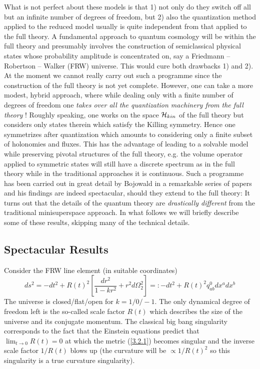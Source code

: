 \documentclass[12pt]{report}
\def\be{\begin{equation}}
\def\ee{\end{equation}}
\begin{document}
What is not perfect about these models is that 1) not only do they switch off
all but an infinite number of degrees of freedom, but 2) also the 
quantization method applied to the reduced model usually is quite 
independent from that applied to the full theory. A fundamental approach to
quantum cosmology will be within the full theory and presumably involves 
the construction of semiclassical physical states whose probability 
amplitude is concentrated on, say a Friedmann -- Robertson -- Walker (FRW)
universe. This would cure both drawbacks 1) and 2). At the moment we 
cannot really carry out such a programme since the construction of the full
theory is not yet complete. However, one can take a more modest, hybrid
approach, where while dealing only with a finite number of degrees of 
freedom one {\it takes over all the quantization machinery from the full 
theory} ! Roughly speaking, one works on the space ${\cal H}_{kin}$ of 
the full theory but considers only states therein which satisfy the 
Killing symmetry. Hence one symmetrizes after quantization which amounts to
considering only a finite subset of holonomies and fluxes. This has the 
advantage of leading to a solvable model while preserving pivotal 
structures of the 
full theory, e.g. the volume operator applied to symmetric states will still
have a discrete spectrum as in the full theory while in the traditional
approaches it is continuous. Such a programme has been carried out in great
detail by Bojowald in a remarkable series of papers \cite{46} and his 
findings are indeed spectacular, should they extend to the full theory:
It turns out that the details of the quantum theory are {\it drastically 
different} from the traditional minisuperspace approach. In what follows 
we will briefly describe some of these results, skipping many of the 
technical details.

\subsection{Spectacular Results}
\label{s3.2.2}

Consider the FRW line element (in suitable coordinates)
\be \label{3.2.1}
ds^2=-dt^2+R(t)^2[\frac{dr^2}{1-kr^2}+r^2d\Omega_2^2]
=:-dt^2+R(t)^2 q^0_{ab} dx^a dx^b
\ee
The universe is closed/flat/open for $k=1/0/-1$. The only dynamical 
degree of freedom left is the so-called scale factor $R(t)$ which 
describes the size of the universe and its conjugate momentum.
The classical big bang singularity corresponds to the fact that the Einstein
equations predict that $\lim_{t\to 0} R(t)=0$ at which the metric
(\ref{3.2.1}) becomes singular and the inverse scale factor 
$1/R(t)$ blows up (the curvature will be $\propto 1/R(t)^2$ so this 
singularity is a true curvature singularity).
\end{document}
